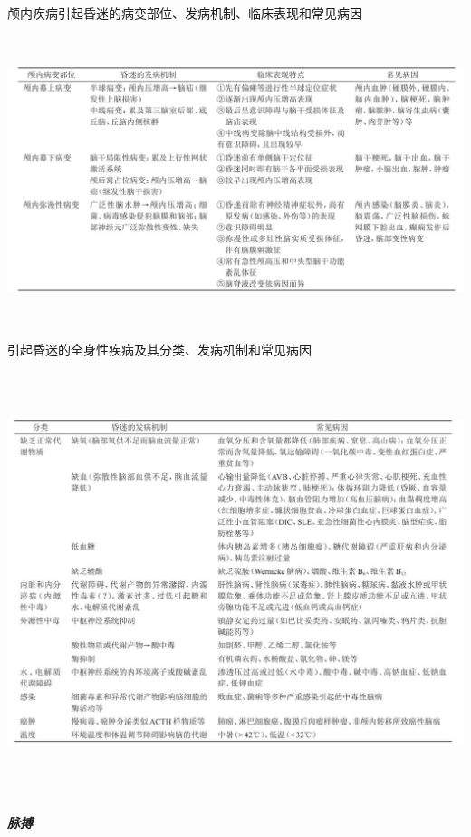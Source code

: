 \begin{table}[htbp]
\centering
\caption{颅内疾病引起昏迷的病变部位、发病机制、临床表现和常见病因}
\label{tab2-1}
\includegraphics[width=6.73958in,height=3.32292in]{./images/Image00004.jpg}
\end{table}

\begin{table}[htbp]
\centering
\caption{引起昏迷的全身性疾病及其分类、发病机制和常见病因}
\label{tab2-2}
\includegraphics[width=6.73958in,height=4.83333in]{./images/Image00005.jpg}
\end{table}

\subparagraph{脉搏}

